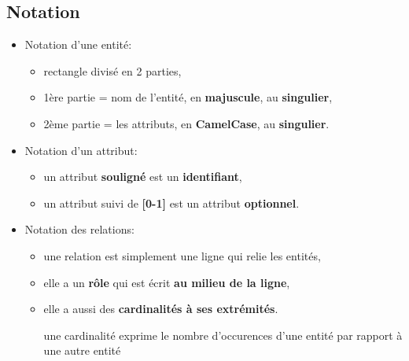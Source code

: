 \documentclass[a4paper]{article}
\begin{document}
\subsection{Notation}





\begin{itemize}



\item Notation d'une entité:
\begin{itemize}
    \item rectangle divisé en 2 parties,
    \item 1ère partie = nom de l'entité, en \textbf{majuscule}, au \textbf{singulier},
    \item 2ème partie = les attributs, en \textbf{CamelCase}, au \textbf{singulier}.
\end{itemize}



\item Notation d'un attribut:
\begin{itemize}
    \item un attribut \textbf{souligné} est un \textbf{identifiant},
    \item un attribut suivi de \textbf{[0-1]} est un attribut \textbf{optionnel}.
\end{itemize}



\item Notation des relations:
\begin{itemize}
    \item une relation est simplement une ligne qui relie les entités,
    \item elle a un \textbf{rôle} qui est écrit \textbf{au milieu de la ligne},
    \item elle a aussi des \textbf{cardinalités à ses extrémités}.
    \begin{example}
        une cardinalité exprime le nombre d'occurences d'une entité par rapport à une autre entité
    \end{example}
\end{itemize}



\end{itemize}
\end{document}
